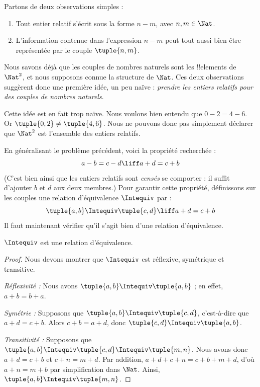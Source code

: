 \documentclass[../../../include/open-logic-section]{subfiles}
\begin{document}

Partons de deux observations simples :
	\begin{enumerate}
		\item Tout entier relatif s'écrit sous la forme $n - m$, avec $n, m \in\Nat$.
		\item L'information contenue dans l'expression $n - m$ peut tout aussi bien être représentée par le couple $\tuple{n, m}$.
	\end{enumerate}
Nous savons déjà que les couples de nombres naturels sont les !!{element}s de $\Nat^2$, et nous supposons connue la structure de $\Nat$. Ces deux observations suggèrent donc une première idée, un peu naïve : \emph{prendre les entiers relatifs pour des couples de nombres naturels}.

Cette idée est en fait trop naïve. Nous voulons bien entendu que $0- 2 = 4 - 6$. Or $\tuple{0, 2 }\neq \tuple{4, 6}$. Nous ne pouvons donc pas simplement déclarer que $\Nat^2$ est l'ensemble des entiers relatifs.

En généralisant le problème précédent, voici la propriété recherchée :
	$$a - b = c - d \liff a + d = c + b$$
(C'est bien ainsi que les entiers relatifs sont \emph{censés} se comporter : il suffit d'ajouter $b$ et $d$ aux deux membres.) Pour garantir cette propriété, définissons sur les couples une relation d'équivalence $\Intequiv$ par :
$$\tuple{ a, b } \Intequiv \tuple{c, d}\liff a + d = c + b$$
Il faut maintenant vérifier qu'il s'agit bien d'une relation d'équivalence.
\begin{prop} $\Intequiv$ est une relation d'équivalence.
\end{prop}
	\begin{proof}
	Nous devons montrer que $\Intequiv$ est réflexive, symétrique et transitive.
	
	\emph{Réflexivité :} Nous avons $\tuple{a, b} \Intequiv \tuple{a, b}$ ; en effet, $a + b = b + a$.
	
	\emph{Symétrie :} Supposons que $\tuple{a, b} \Intequiv \tuple{c, d}$, c'est-à-dire que $a + d = c + b$. Alors $c + b = a + d$, donc $\tuple{c, d} \Intequiv \tuple{a, b}$.
	
	\emph{Transitivité :} Supposons que $\tuple{a, b} \Intequiv \tuple{c, d}\Intequiv \tuple{m, n}$. Nous avons donc $a + d = c + b$ et $c + n = m + d$. Par addition, $a + d + c + n = c + b + m + d$, d'où $a + n = m + b$ par simplification dans $\Nat$. Ainsi, $\tuple{a, b } \Intequiv \tuple{m, n}$.
\end{proof}
\end{document}
